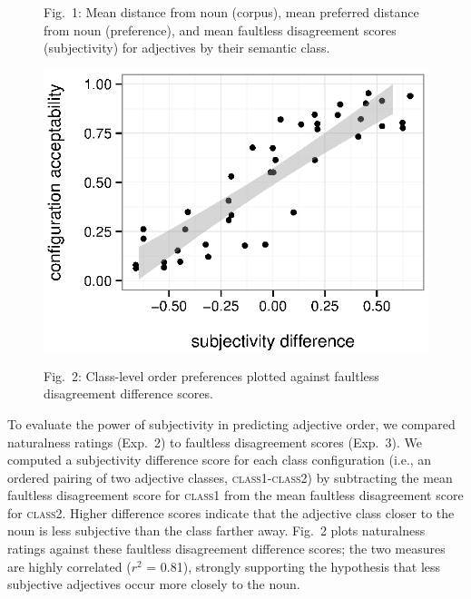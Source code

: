 \documentclass[12pt]{article}
\begin{document}
\begin{figure}
\begin{center}
	\end{center}
	\vspace{-15pt}
	Fig.~1: Mean distance from noun (corpus), mean preferred distance from noun  (preference), and mean faultless disagreement scores (subjectivity) for adjectives by their semantic class.
	\vspace{-10pt}
	\begin{center}
		\includegraphics[width=.9\linewidth]{plots/comparison2.eps}
	\end{center}
	\vspace{-10pt}
	Fig.~2: Class-level order preferences plotted against faultless disagreement difference scores.
\end{figure}
\vspace{-15pt}

To evaluate the power of subjectivity in predicting adjective order, we compared naturalness ratings (Exp.~2) to faultless disagreement scores (Exp.~3). We  computed a subjectivity difference score for each class configuration (i.e., an ordered pairing of two adjective classes, \textsc{class1}-\textsc{class2}) by subtracting the mean faultless disagreement score for \textsc{class1} from the mean faultless disagreement score for \textsc{class2}. Higher difference scores indicate that the adjective class closer to the noun is less subjective than the class farther away. Fig.~2 plots naturalness ratings  against these faultless disagreement difference scores; the two measures are highly correlated ($r^2$ = 0.81), strongly supporting the hypothesis that less subjective adjectives occur more closely to the noun.
\end{document}
